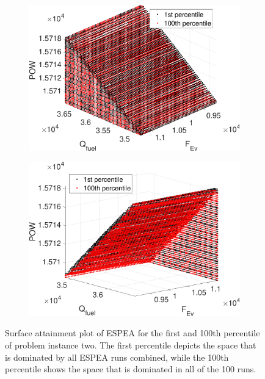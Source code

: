 \begin{figure}
	\begin{subfigure}{0.47\textwidth}
	\includegraphics[width=\textwidth]{figures/safront_cropped.pdf}
	\end{subfigure}
\hfill
	\begin{subfigure}{0.47\textwidth}
	\includegraphics[width=\textwidth]{figures/saback_cropped.pdf}
	\end{subfigure}
\caption{Surface attainment plot of ESPEA for the first and 100th percentile of problem instance two. The first percentile depicts the space that is dominated by all ESPEA runs combined, while the 100th percentile shows the space that is dominated in all of the 100 runs.}
\label{fig:surfaceattainment}
\end{figure}

